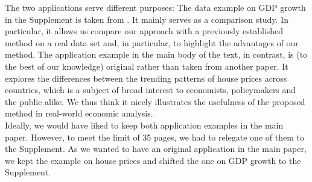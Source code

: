 \documentclass[a4paper,12pt]{article}
\begin{document}
\begin{enumerate}[label=\arabic*.,leftmargin=0.6cm]
The two applications serve different purposes:
The data example on GDP growth in the Supplement is taken from \cite{Zhang2012}. It mainly serves as a comparison study. In particular, it allows us compare our approach with a previously established method on a real data set and, in particular, to highlight the advantages of our method. 
The application example in the main body of the text, in contrast, is (to the best of our knowledge) original rather than taken from another paper. It explores the differences between the trending patterns of house prices across countries, which is a subject of broad interest to economists, policymakers and the public alike. We thus think it nicely illustrates the usefulness of the proposed method in real-world economic analysis. \\
Ideally, we would have liked to keep both application examples in the main paper. However, to meet the limit of 35 pages, we had to relegate one of them to the Supplement. As we wanted to have an original application in the main paper, we kept the example on house prices and shifted the one on GDP growth to the Supplement. 




\end{enumerate}
\end{document}
